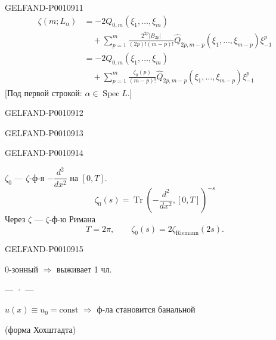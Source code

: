 \begin{GelfandAdjacentEvidence}{GELFAND-P001091}{1}
\begin{equation*}
\begin{aligned}
\zeta(m;L_\alpha)
&=-2Q_{0,m}(\xi_1,\ldots,\xi_m)\\
&\quad+\sum_{p=1}^m\frac{2^{2p}\lvert B_{2p}\rvert}{(2p)!(m-p)!}
\widehat Q_{2p,m-p}(\xi_1,\ldots,\xi_{m-p})\xi_{-1}^p\\
&=-2Q_{0,m}(\xi_1,\ldots,\xi_m)\\
&\quad+\sum_{p=1}^m\frac{\zeta_0(p)}{(m-p)!}
\widehat Q_{2p,m-p}(\xi_1,\ldots,\xi_{m-p})\xi_{-1}^p
\end{aligned}
\tag{11}
\end{equation*}
[Под первой строкой: $\alpha\in\operatorname{Spec}L$.]
\end{GelfandAdjacentEvidence}
\begin{GelfandAdjacentEvidence}{GELFAND-P001091}{2}

\end{GelfandAdjacentEvidence}
\begin{GelfandAdjacentEvidence}{GELFAND-P001091}{3}

\end{GelfandAdjacentEvidence}
\begin{GelfandAdjacentEvidence}{GELFAND-P001091}{4}


$\zeta_0$ — $\zeta$-ф-я $-\dfrac{d^2}{dx^2}$ на $[0,T]$.
\[
\zeta_0(s)=\operatorname{Tr}\left(-\frac{d^2}{dx^2},[0,T]\right)^{-s}
\]
Через $\zeta$ — $\zeta$-ф-ю Римана
\[
T=2\pi,\qquad\zeta_0(s)=2\zeta_{\mathrm{Riemann}}(2s).
\]
\end{GelfandAdjacentEvidence}
\begin{GelfandAdjacentEvidence}{GELFAND-P001091}{5}


0-зонный $\Rightarrow$ выживает 1 чл.

\begin{center}— · —\end{center}

$u(x)\equiv u_0=\mathrm{const}$ $\Rightarrow$ ф-ла становится банальной

(форма Хохштадта)
\end{GelfandAdjacentEvidence}
